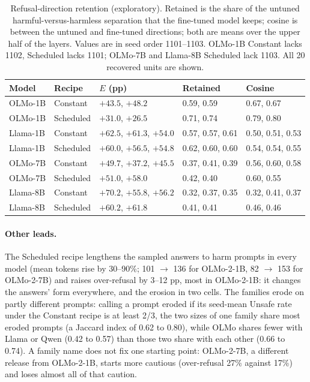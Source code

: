 \documentclass{article}
\begin{document}
\begin{table}[t]
  \caption{Refusal-direction retention (exploratory). Retained is the share of
    the untuned harmful-versus-harmless separation that the fine-tuned model
    keeps; cosine is between the untuned and fine-tuned directions; both are
    means over the upper half of the layers. Values are in seed order
    1101--1103. OLMo-1B Constant lacks 1102, Scheduled lacks 1101;
    OLMo-7B and Llama-8B Scheduled lack 1103. All 20 recovered units are shown.}
  \label{tab:direction}
  \centering
  \footnotesize
  \setlength{\tabcolsep}{2pt}
  \begin{tabular}{@{}l l l l l@{}}
    \toprule
    Model & Recipe & $E$ (pp) & Retained & Cosine \\
    \midrule
    OLMo-1B & Constant & $+43.5$, $+48.2$ & 0.59, 0.59 & 0.67, 0.67 \\
    OLMo-1B & Scheduled & $+31.0$, $+26.5$ & 0.71, 0.74 & 0.79, 0.80 \\
    Llama-1B & Constant & $+62.5$, $+61.3$, $+54.0$ & 0.57, 0.57, 0.61 & 0.50, 0.51, 0.53 \\
    Llama-1B & Scheduled & $+60.0$, $+56.5$, $+54.8$ & 0.62, 0.60, 0.60 & 0.54, 0.54, 0.55 \\
    OLMo-7B & Constant & $+49.7$, $+37.2$, $+45.5$ & 0.37, 0.41, 0.39 & 0.56, 0.60, 0.58 \\
    OLMo-7B & Scheduled & $+51.0$, $+58.0$ & 0.42, 0.40 & 0.60, 0.55 \\
    Llama-8B & Constant & $+70.2$, $+55.8$, $+56.2$ & 0.32, 0.37, 0.35 & 0.32, 0.41, 0.37 \\
    Llama-8B & Scheduled & $+60.2$, $+61.8$ & 0.41, 0.41 & 0.46, 0.46 \\
    \bottomrule
  \end{tabular}
\end{table}

\paragraph{Other leads.} The Scheduled recipe lengthens the sampled answers to
harm prompts in every model (mean tokens rise by 30--90\%; 101 $\to$ 136 for
OLMo-2-1B, 82 $\to$ 153 for OLMo-2-7B) and raises over-refusal by 3--12 pp,
most in OLMo-2-1B: it changes the answers' form everywhere, and the erosion in
two cells. The families erode on partly different prompts: calling a prompt
eroded if its seed-mean Unsafe rate under the Constant recipe is at least
2/3, the two sizes of one family share most eroded prompts (a Jaccard index
of 0.62 to 0.80), while OLMo shares fewer with Llama or Qwen (0.42 to 0.57)
than those two share with each other (0.66 to 0.74). A family name does not fix one
starting point: OLMo-2-7B, a different release from OLMo-2-1B, starts more
cautious (over-refusal 27\% against 17\%) and loses almost all of that
caution.
\end{document}
